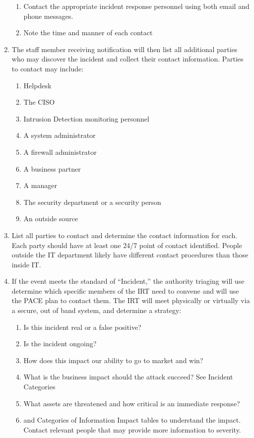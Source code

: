 \documentclass[../main.tex]{subfiles}
\begin{document}
\begin{enumerate}
\begin{enumerate}
        \item Contact the appropriate incident response personnel using both email and phone messages.
        \item Note the time and manner of each contact
    \end{enumerate}
    \item The staff member receiving notification will then list all additional parties who may discover the incident and collect their contact information.
    Parties to contact may include:
    \begin{enumerate}
        \item Helpdesk
        \item The CISO
        \item Intrusion Detection monitoring personnel
        \item A system administrator
        \item A firewall administrator
        \item A business partner
        \item A manager
        \item The security department or a security person
        \item An outside source
    \end{enumerate}
    \item List all parties to contact and determine the contact information for each. Each party should have at least one 24/7 point of contact identified.
    People outside the IT department likely have different contact procedures than those inside IT.
    \item If the event meets the standard of “Incident,” the authority triaging will use determine which specific members of the IRT need to convene
    and will use the PACE plan to contact them. The IRT will meet physically or virtually via a secure, out of band system, and determine a strategy:
    \begin{enumerate}
        \item Is this incident real or a false positive?
        \item Is the incident ongoing?
        \item How does this impact our ability to go to market and win?
        \item What is the business impact should the attack succeed? See Incident Categories
        \item What assets are threatened and how critical is an immediate response?
        \item and Categories of Information Impact tables to understand the impact. Contact relevant people that may provide more information to severity.

\end{enumerate}
\end{enumerate}
\end{document}
